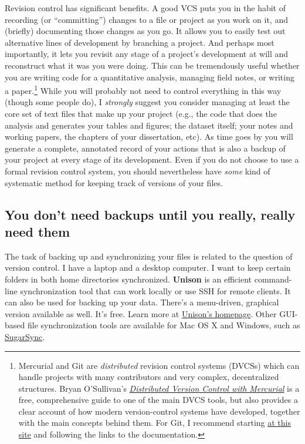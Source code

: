 \documentclass[11pt,article,oneside]{memoir}
\begin{document}
Revision control has significant benefits. A good VCS puts you in the habit of recording (or ``committing'') changes to a file or project as you work on it, and (briefly) documenting those changes as you go. It allows you to easily test out alternative lines of development by branching a project. And perhaps most importantly, it lets you revisit any stage of a project's development at will and reconstruct what it was you were doing. This can be tremendously useful whether you are writing code for a quantitative analysis, managing field notes, or writing a paper.\footnote{Mercurial and Git are \emph{distributed} revision control systems (DVCSs) which can handle projects with many contributors and very complex, decentralized structures. Bryan O'Sullivan's \href{http://hgbook.red-bean.com/hgbook.pdf}{\emph{Distributed Version Control with Mercurial}} is a free, comprehensive guide to one of the main DVCS tools, but also provides a clear account of how modern version-control systems have developed, together with the main concepts behind them. For Git, I recommend starting \href{http://git-scm.com/}{at this site} and following the links to the documentation.} While you will probably not need to control everything in this way (though some people do), I \emph{strongly} suggest you consider managing at least the core set of text files that make up your project (e.g., the code that does the analysis and generates your tables and figures; the dataset itself; your notes and working papers, the chapters of your dissertation, etc). As time goes by you will generate a complete, annotated  record of your actions that is also a backup of your project at every stage of its development. Even if you do not choose to use a formal revision control system, you should nevertheless have \emph{some} kind of systematic method for keeping track of versions of your files. 

\subsection{You don't need backups until you really, really need them}
The task of backing up and synchronizing your files is related to the question of version control. I have a laptop and a desktop computer. I want to keep certain folders in both home directories synchronized. \textbf{Unison} is an efficient command-line synchronization tool that can work locally or use SSH for remote clients. It can also be used for backing up your data. There's a menu-driven, graphical version available as well. It's free. Learn more at \href{http://www.cis.upenn.edu/~bcpierce/unison/}{Unison's homepage}. Other GUI-based file synchronization tools are available for Mac OS X and Windows, such as \href{http://www.sugarsync.com/}{SugarSync}. 
\end{document}
